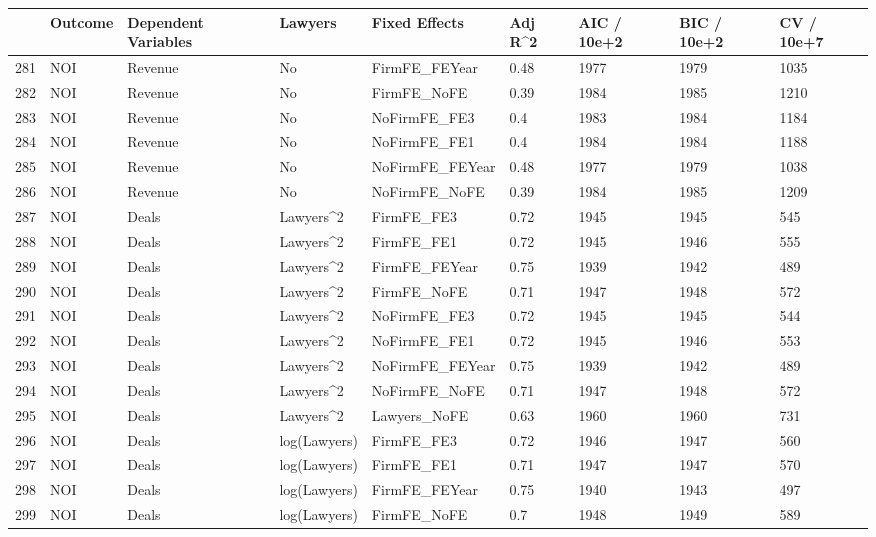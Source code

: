 \documentclass{article}
\begin{document}
\begin{table}[H]
\centering
\begin{tabular}{rllllllll}
  \hline
 & Outcome & Dependent Variables & Lawyers & Fixed Effects & Adj R^2 & AIC / 10e+2 & BIC / 10e+2 & CV / 10e+7 \\ 
  \hline
281 & NOI & Revenue & No & FirmFE\_FEYear & 0.48 & 1977 & 1979 & 1035 \\ 
  282 & NOI & Revenue & No & FirmFE\_NoFE & 0.39 & 1984 & 1985 & 1210 \\ 
  283 & NOI & Revenue & No & NoFirmFE\_FE3 & 0.4 & 1983 & 1984 & 1184 \\ 
  284 & NOI & Revenue & No & NoFirmFE\_FE1 & 0.4 & 1984 & 1984 & 1188 \\ 
  285 & NOI & Revenue & No & NoFirmFE\_FEYear & 0.48 & 1977 & 1979 & 1038 \\ 
  286 & NOI & Revenue & No & NoFirmFE\_NoFE & 0.39 & 1984 & 1985 & 1209 \\ 
  287 & NOI & Deals & Lawyers^2 & FirmFE\_FE3 & 0.72 & 1945 & 1945 & 545 \\ 
  288 & NOI & Deals & Lawyers^2 & FirmFE\_FE1 & 0.72 & 1945 & 1946 & 555 \\ 
  289 & NOI & Deals & Lawyers^2 & FirmFE\_FEYear & 0.75 & 1939 & 1942 & 489 \\ 
  290 & NOI & Deals & Lawyers^2 & FirmFE\_NoFE & 0.71 & 1947 & 1948 & 572 \\ 
  291 & NOI & Deals & Lawyers^2 & NoFirmFE\_FE3 & 0.72 & 1945 & 1945 & 544 \\ 
  292 & NOI & Deals & Lawyers^2 & NoFirmFE\_FE1 & 0.72 & 1945 & 1946 & 553 \\ 
  293 & NOI & Deals & Lawyers^2 & NoFirmFE\_FEYear & 0.75 & 1939 & 1942 & 489 \\ 
  294 & NOI & Deals & Lawyers^2 & NoFirmFE\_NoFE & 0.71 & 1947 & 1948 & 572 \\ 
  295 & NOI & Deals & Lawyers^2 & Lawyers\_NoFE & 0.63 & 1960 & 1960 & 731 \\ 
  296 & NOI & Deals & log(Lawyers) & FirmFE\_FE3 & 0.72 & 1946 & 1947 & 560 \\ 
  297 & NOI & Deals & log(Lawyers) & FirmFE\_FE1 & 0.71 & 1947 & 1947 & 570 \\ 
  298 & NOI & Deals & log(Lawyers) & FirmFE\_FEYear & 0.75 & 1940 & 1943 & 497 \\ 
  299 & NOI & Deals & log(Lawyers) & FirmFE\_NoFE & 0.7 & 1948 & 1949 & 589 \\ 

\end{tabular}
\end{table}
\end{document}
